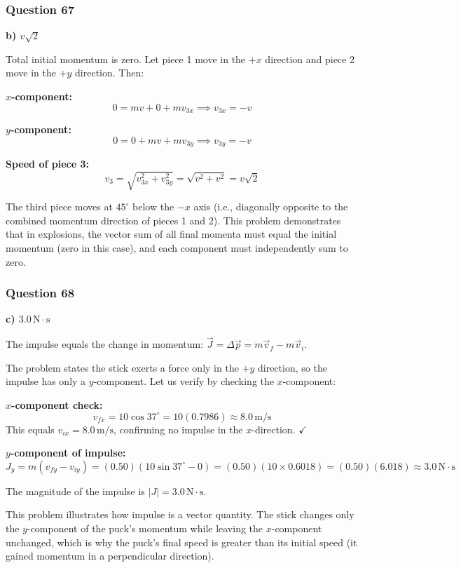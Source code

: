 \documentclass[12pt,letterpaper]{article}
\begin{document}
\subsubsection*{Question 67}

\begin{answerbox}
\textbf{b) $v\sqrt{2}$}
\end{answerbox}

\begin{explanationbox}
Total initial momentum is zero. Let piece 1 move in the $+x$ direction and piece 2 move in the $+y$ direction. Then:

\textbf{$x$-component:}
\[
0 = mv + 0 + mv_{3x} \implies v_{3x} = -v
\]

\textbf{$y$-component:}
\[
0 = 0 + mv + mv_{3y} \implies v_{3y} = -v
\]

\textbf{Speed of piece 3:}
\[
v_3 = \sqrt{v_{3x}^2 + v_{3y}^2} = \sqrt{v^2 + v^2} = v\sqrt{2}
\]

The third piece moves at $45^\circ$ below the $-x$ axis (i.e., diagonally opposite to the combined momentum direction of pieces 1 and 2). This problem demonstrates that in explosions, the vector sum of all final momenta must equal the initial momentum (zero in this case), and each component must independently sum to zero.
\end{explanationbox}

\subsubsection*{Question 68}

\begin{answerbox}
\textbf{c) $3.0\,\text{N}\cdot\text{s}$}
\end{answerbox}

\begin{explanationbox}
The impulse equals the change in momentum: $\vec{J} = \Delta\vec{p} = m\vec{v}_f - m\vec{v}_i$.

The problem states the stick exerts a force only in the $+y$ direction, so the impulse has only a $y$-component. Let us verify by checking the $x$-component:

\textbf{$x$-component check:}
\[
v_{fx} = 10\cos 37^\circ = 10(0.7986) \approx 8.0\,\text{m/s}
\]
This equals $v_{ix} = 8.0\,\text{m/s}$, confirming no impulse in the $x$-direction. $\checkmark$

\textbf{$y$-component of impulse:}
\[
J_y = m(v_{fy} - v_{iy}) = (0.50)(10\sin 37^\circ - 0) = (0.50)(10 \times 0.6018) = (0.50)(6.018) \approx 3.0\,\text{N}\cdot\text{s}
\]

The magnitude of the impulse is $|J| = 3.0\,\text{N}\cdot\text{s}$.

This problem illustrates how impulse is a vector quantity. The stick changes only the $y$-component of the puck's momentum while leaving the $x$-component unchanged, which is why the puck's final speed is greater than its initial speed (it gained momentum in a perpendicular direction).
\end{explanationbox}
\end{document}
